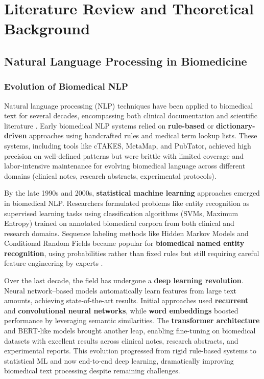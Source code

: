 
\chapter{Literature Review and Theoretical Background}
\label{chap:literature}

\section{Natural Language Processing in Biomedicine}

\subsection{Evolution of Biomedical NLP}

Natural language processing (NLP) techniques have been applied to biomedical text for several decades, encompassing both clinical documentation and scientific literature \parencite{Liu2024}. Early biomedical NLP systems relied on \textbf{rule-based} or \textbf{dictionary-driven} approaches using handcrafted rules and medical term lookup lists. These systems, including tools like cTAKES, MetaMap, and PubTator, achieved high precision on well-defined patterns but were brittle with limited coverage and labor-intensive maintenance for evolving biomedical language across different domains (clinical notes, research abstracts, experimental protocols).

By the late 1990s and 2000s, \textbf{statistical machine learning} approaches emerged in biomedical NLP. Researchers formulated problems like entity recognition as supervised learning tasks using classification algorithms (SVMs, Maximum Entropy) trained on annotated biomedical corpora from both clinical and research domains. Sequence labeling methods like Hidden Markov Models and Conditional Random Fields became popular for \textbf{biomedical named entity recognition}, using probabilities rather than fixed rules but still requiring careful feature engineering by experts \parencite{Stenetorp2024}.

Over the last decade, the field has undergone a \textbf{deep learning revolution}. Neural network–based models automatically learn features from large text amounts, achieving state-of-the-art results. Initial approaches used \textbf{recurrent} and \textbf{convolutional neural networks}, while \textbf{word embeddings} boosted performance by leveraging semantic similarities. The \textbf{transformer architecture} and BERT-like models brought another leap, enabling fine-tuning on biomedical datasets with excellent results across clinical notes, research abstracts, and experimental reports. This evolution progressed from rigid rule-based systems to statistical ML and now end-to-end deep learning, dramatically improving biomedical text processing despite remaining challenges.

